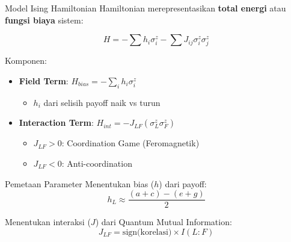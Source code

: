 \documentclass[aspectratio=169]{beamer}
\begin{document}
\begin{frame}{Model Ising Hamiltonian}
    Hamiltonian merepresentasikan \textbf{total energi} atau \textbf{fungsi biaya} sistem:
    
    \begin{equation}
        H = -\sum h_i \sigma_i^z - \sum J_{ij} \sigma_i^z \sigma_j^z
    \end{equation}
    
    \vspace{0.3cm}
    
    Komponen:
    \begin{itemize}
        \item \textbf{Field Term}: $H_{bias} = -\sum_{i} h_i \sigma_i^z$
            \begin{itemize}
                \item $h_i$ dari selisih payoff naik vs turun
            \end{itemize}
        \item \textbf{Interaction Term}: $H_{int} = -J_{LF} (\sigma_L^z \sigma_F^z)$
            \begin{itemize}
                \item $J_{LF} > 0$: Coordination Game (Feromagnetik)
                \item $J_{LF} < 0$: Anti-coordination
            \end{itemize}
    \end{itemize}
\end{frame}

\begin{frame}{Pemetaan Parameter}
    Menentukan bias ($h$) dari payoff:
    \begin{equation}
        h_L \approx \frac{(a+c) - (e+g)}{2}
    \end{equation}
    
    \vspace{0.3cm}
    
    Menentukan interaksi ($J$) dari Quantum Mutual Information:
    \begin{equation}
        J_{LF} = \text{sign(korelasi)} \times I(L:F)
    \end{equation}
\end{frame}
\end{document}

